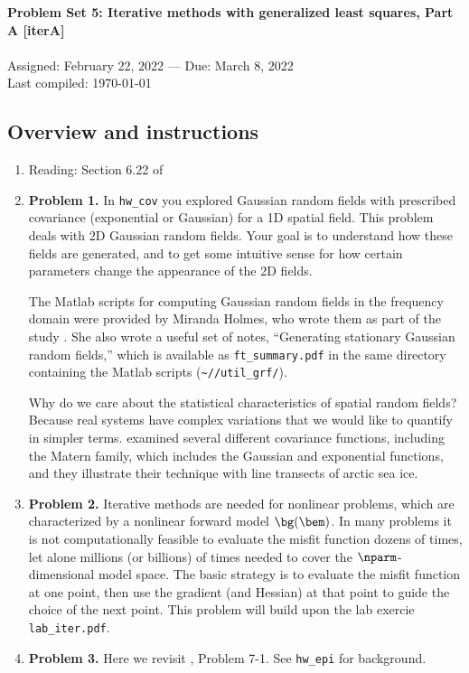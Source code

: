 \documentclass[11pt,titlepage,fleqn]{article}
\begin{document}
 

\begin{spacing}{1.2}
\centering
{\large \bf Problem Set 5: Iterative methods with generalized least squares, Part A [iterA]} \\
\cltag\ \\
Assigned: February 22, 2022 --- Due: March 8, 2022 \\
Last compiled: \today
\end{spacing}


\subsection*{Overview and instructions}

\begin{enumerate}
\item Reading: Section 6.22 of \citet{Tarantola2005}

\item {\bf Problem 1.} In \verb+hw_cov+ you explored Gaussian random fields with prescribed covariance (exponential or Gaussian) for a 1D spatial field. This problem deals with 2D Gaussian random fields. Your goal is to understand how these fields are generated, and to get some intuitive sense for how certain parameters change the appearance of the 2D fields.

The Matlab scripts for computing Gaussian random fields in the frequency domain were provided by Miranda Holmes, who wrote them as part of the study \citet{BuhlerHolmes2009}. She also wrote a useful set of notes, ``Generating stationary Gaussian random fields,'' which is available as \verb+ft_summary.pdf+ in the same directory containing the Matlab scripts (\verb+~/+\repodir\verb+/util_grf/+).

Why do we care about the statistical characteristics of spatial random fields? Because real systems have complex variations that we would like to quantify in simpler terms. \citet{Gneiting2012} examined several different covariance functions, including the Matern family, which includes the Gaussian and exponential functions, and they illustrate their technique with line transects of arctic sea ice.

\item {\bf Problem 2.} Iterative methods are needed for nonlinear problems, which are characterized by a nonlinear forward model $\bg(\bem)$. In many problems it is not computationally feasible to evaluate the misfit function dozens of times, let alone millions (or billions) of times needed to cover the $\nparm$-dimensional model space. The basic strategy is to evaluate the misfit function at one point, then use the gradient (and Hessian) at that point to guide the choice of the next point. This problem will build upon the lab exercie \verb+lab_iter.pdf+.

\item {\bf Problem 3.} Here we revisit \citet{Tarantola2005}, Problem 7-1. See \verb+hw_epi+ for background.

\end{enumerate}
\end{document}
